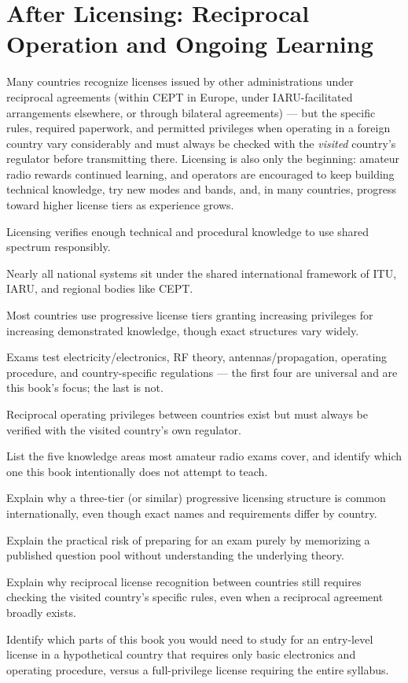 \section{After Licensing: Reciprocal Operation and Ongoing Learning}

Many countries recognize licenses issued by other administrations under
reciprocal agreements (within CEPT in Europe, under IARU-facilitated
arrangements elsewhere, or through bilateral agreements) --- but the
specific rules, required paperwork, and permitted privileges when
operating in a foreign country vary considerably and must always be
checked with the \emph{visited} country's regulator before transmitting
there. Licensing is also only the beginning: amateur radio rewards
continued learning, and operators are encouraged to keep building
technical knowledge, try new modes and bands, and, in many countries,
progress toward higher license tiers as experience grows.

\begin{quickreview}
\item Licensing verifies enough technical and procedural knowledge to
use shared spectrum responsibly.
\item Nearly all national systems sit under the shared international
framework of ITU, IARU, and regional bodies like CEPT.
\item Most countries use progressive license tiers granting increasing
privileges for increasing demonstrated knowledge, though exact
structures vary widely.
\item Exams test electricity/electronics, RF theory, antennas/propagation,
operating procedure, and country-specific regulations --- the first
four are universal and are this book's focus; the last is not.
\item Reciprocal operating privileges between countries exist but must
always be verified with the visited country's own regulator.
\end{quickreview}

\begin{practiceproblems}
\item List the five knowledge areas most amateur radio exams cover, and
identify which one this book intentionally does not attempt to teach.
\item Explain why a three-tier (or similar) progressive licensing
structure is common internationally, even though exact names and
requirements differ by country.
\item Explain the practical risk of preparing for an exam purely by
memorizing a published question pool without understanding the
underlying theory.
\item Explain why reciprocal license recognition between countries still
requires checking the visited country's specific rules, even when a
reciprocal agreement broadly exists.
\item Identify which parts of this book you would need to study for an
entry-level license in a hypothetical country that requires only basic
electronics and operating procedure, versus a full-privilege license
requiring the entire syllabus.
\end{practiceproblems}

